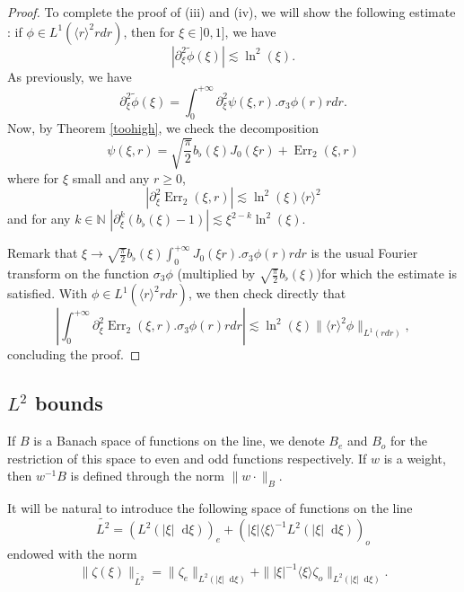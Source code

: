 \documentclass[11 pt]{amsart}
\newcommand{\tmop}[1]{\ensuremath{\operatorname{#1}}}
\theoremstyle{definition}
\theoremstyle{remark}
\numberwithin{equation}{section}
\newcommand{\dd}{\mathop{}\!\mathrm{d}}
\begin{document}
\begin{proof}
  To complete the proof of (iii) and (iv), we will show the following estimate
  : if $\phi \in L^1 (\langle r \rangle^2 r d r)$, then for $\xi \in] 0, 1]$,
  we have
  \[ | \partial^2_{\xi} \widetilde{\phi} (\xi) | \lesssim \ln^2 (\xi) . \]
  As previously, we have
  \[ \partial^2_{\xi} \widetilde{\phi} (\xi) = \int_0^{+ \infty} \partial^2_{\xi}
     \psi (\xi, r) . \sigma_3 \phi (r) r d r. \]
  Now, by Theorem \ref{toohigh}, we check the decomposition
  \[ \psi (\xi, r) = \sqrt{\frac{\pi}{2}} b_{\flat} (\xi) J_0 (\xi r) +
     \tmop{Err}_2 (\xi, r) \]
  where for $\xi$ small and any $r \geqslant 0$,
  \[ | \partial_{\xi}^2 \tmop{Err}_2 (\xi, r) | \lesssim \ln^2 (\xi) \langle r
     \rangle^2 \]
  and for any $k \in \mathbb{N}$ $| \partial_{\xi}^k (b_{\flat} (\xi) - 1) |
  \lesssim \xi^{2 - k} \ln^2 (\xi)$.
  
  Remark that $\xi \rightarrow \sqrt{\frac{\pi}{2}} b_{\flat} (\xi) \int_0^{+
  \infty} J_0 (\xi r) . \sigma_3 \phi (r) r d r$ is the usual Fourier
  transform on the function $\sigma_3 \phi$ (multiplied by
  $\sqrt{\frac{\pi}{2}} b_{\flat} (\xi)$)for which the estimate is satisfied.
  With $\phi \in L^1 (\langle r \rangle^2 r d r)$, we then check directly that
  \[ \left| \int_0^{+ \infty} \partial_{\xi}^2 \tmop{Err}_2 (\xi, r) .
     \sigma_3 \phi (r) r d r \right| \lesssim \ln^2 (\xi) \| \langle r
     \rangle^2 \phi \|_{L^1 (r d r)}, \]
  concluding the proof.
\end{proof}

\subsection{$L^2$ bounds}
If $B$ is a Banach space of functions on the line, we denote $B_e$ and $B_o$ for the restriction of this space to even and odd functions respectively. If $w$ is a weight, then $w^{-1} B$ is defined through the norm $\| w \cdot \|_B$.

It will be natural to introduce the following space of functions on the line
$$
\widetilde{L^2} = (L^2 (| \xi | \dd \xi))_e + (| \xi |
\langle \xi \rangle^{- 1} L^2 (| \xi | \dd \xi))_o
$$
endowed with the norm
$$
\| \zeta(\xi) \|_{\widetilde{L^2}} = \| \zeta_e \|_{L^2 (| \xi | \dd \xi)} + \|| \xi |^{-1} \langle \xi \rangle \zeta_o \|_{L^2 (| \xi | \dd \xi)}.
$$
\end{document}
